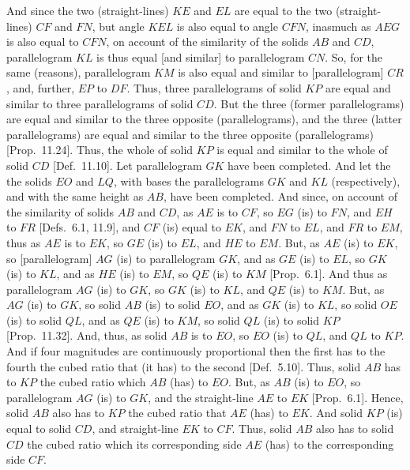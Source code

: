 And since the two (straight-lines) $KE$ and $EL$ are equal to the
two (straight-lines) $CF$ and $FN$, but angle $KEL$ is also
equal to angle $CFN$, inasmuch as $AEG$ is also equal to $CFN$,
on account of the similarity of the solids $AB$ and $CD$, parallelogram
$KL$ is thus equal [and similar] to parallelogram $CN$. So,
for the same (reasons), parallelogram $KM$ is also  equal and similar to
[parallelogram] $CR$, and, further, $EP$ to $DF$. Thus,
three parallelograms of solid $KP$ are equal and similar to three
parallelograms of solid $CD$. But the three (former parallelograms) are equal and
similar to the three opposite (parallelograms), and the three (latter parallelograms)
are equal and similar to the three opposite (parallelograms) 
[Prop.~11.24]. Thus, the whole of solid $KP$
is equal and similar to the whole of solid $CD$ [Def.~11.10]. Let parallelogram $GK$ have been completed. And
let the the solids $EO$ and $LQ$, with bases the parallelograms
$GK$ and $KL$ (respectively), and with the same height as $AB$, have been completed. And since, on account of the similarity of solids $AB$ and $CD$, 
as $AE$ is to $CF$, so $EG$ (is) to $FN$,  and $EH$  to $FR$ [Defs.~6.1, 11.9],
and $CF$ (is) equal to $EK$, and $FN$ to $EL$, and $FR$ to $EM$, 
thus as $AE$ is to $EK$, so $GE$ (is) to $EL$, and $HE$ to $EM$. But,
as $AE$ (is) to $EK$, so [parallelogram] $AG$ (is) to parallelogram
$GK$, and as $GE$ (is) to $EL$, so $GK$ (is) to $KL$,
and as $HE$ (is) to $EM$, so $QE$ (is) to $KM$ [Prop.~6.1]. And thus as parallelogram $AG$ (is) to $GK$, so $GK$
(is) to $KL$, and $QE$ (is) to $KM$. But, as $AG$
(is) to $GK$, so solid $AB$ (is) to solid $EO$, and as $GK$ (is) to $KL$,
so solid $OE$ (is) to  solid $QL$, and as $QE$ (is) to $KM$, so solid
$QL$ (is) to solid $KP$ [Prop.~11.32].
And, thus, as solid $AB$ is to $EO$, so $EO$ (is) to $QL$, and
$QL$ to $KP$.
And if four magnitudes are continuously proportional then the first has to
the fourth the cubed ratio that (it has) to the second [Def.~5.10].  Thus, solid $AB$ has to $KP$ the 
cubed ratio
which $AB$ (has) to $EO$. 
But, as $AB$ (is) to $EO$, so parallelogram $AG$
(is) to $GK$, and the straight-line $AE$ to $EK$ [Prop.~6.1]. Hence, 
solid $AB$ also has to $KP$ the cubed ratio  that $AE$ (has) to
$EK$. And solid $KP$ (is) equal to solid $CD$, and straight-line $EK$ to
$CF$.  Thus, solid $AB$ also has to solid $CD$ the cubed ratio
which its corresponding side $AE$ (has) to the corresponding side
$CF$.

\epsfysize=2.5in
\centerline{}


